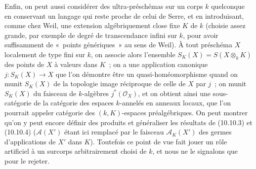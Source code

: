 \begin{env}[10.10.5]
\label{IV.10.10.5-fr}
Enfin, on peut aussi considérer des ultra-préschémas sur un corps $k$
quelconque en conservant un langage qui reste proche de celui de Serre, et en
introduisant, comme chez Weil, une extension algébriquement close fixe $K$ de
$k$ (choisie assez grande, par exemple de degré de transcendance infini sur
$k$, pour avoir suffisamment de «~points génériques~» au sens de Weil). À tout
préschéma $X$ localement de type fini sur $k$, on associe alors l'ensemble
$S_K(X)=S(X\otimes_kK)$ des points de $X$ à valeurs dans $K$~; on a une
application canonique $j:S_K(X)\to X$ que l'on démontre être un
quasi-homéomorphisme quand on munit $S_K(X)$ de la topologie image réciproque
de celle de $X$ par $j$~; on munit $S_K(X)$ du faisceau de $k$-algèbres
$j^*(\mathcal O_X)$, et on obtient ainsi une sous-catégorie de la catégorie des
espaces $k$-annelés en anneaux locaux, que l'on pourrait appeler catégorie des
$(k,K)$-espaces préalgébriques. On peut montrer qu'on y peut encore définir des
produits et généraliser les résultats de (10.10.3) et (10.10.4)
($\mathcal A(X')$ étant ici remplacé par le faisceau $\mathcal A_K(X')$ des
germes d'applications de $X'$ dans $K$). Toutefois ce point de vue fait jouer
un rôle artificiel à un surcorps arbitrairement choisi de $k$, et nous ne le
signalons que pour le rejeter.
\end{env}
